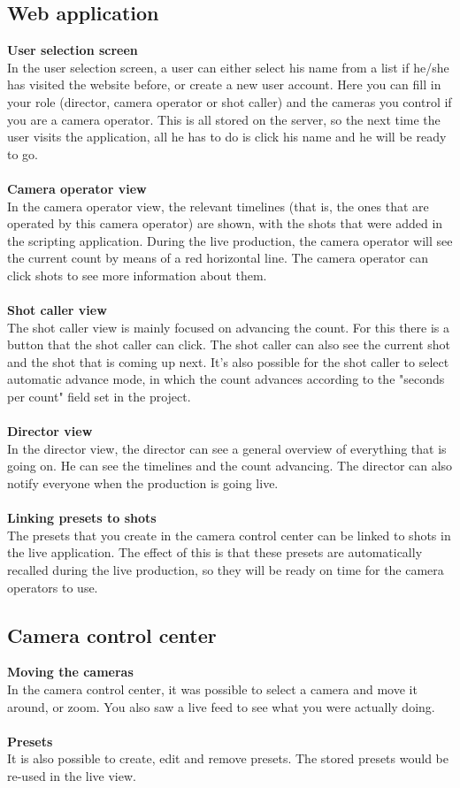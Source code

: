 \subsection{Web application}
\textbf{User selection screen}\\
In the user selection screen, a user can either select his name from a list if he/she has visited the website before, or create a new user account. Here you can fill in your role (director, camera operator or shot caller) and the cameras you control if you are a camera operator. This is all stored on the server, so the next time the user visits the application, all he has to do is click his name and he will be ready to go.\\\\
\textbf{Camera operator view}\\
In the camera operator view, the relevant timelines (that is, the ones that are operated by this camera operator) are shown, with the shots that were added in the scripting application. During the live production, the camera operator will see the current count by means of a red horizontal line. The camera operator can click shots to see more information about them.\\\\
\textbf{Shot caller view}\\
The shot caller view is mainly focused on advancing the count. For this there is a button that the shot caller can click. The shot caller can also see the current shot and the shot that is coming up next. It's also possible for the shot caller to select automatic advance mode, in which the count advances according to the "seconds per count" field set in the project.\\\\
\textbf{Director view}\\
In the director view, the director can see a general overview of everything that is going on. He can see the timelines and the count advancing. The director can also notify everyone when the production is going live.\\\\
\textbf{Linking presets to shots}\\
The presets that you create in the camera control center can be linked to shots in the live application. The effect of this is that these presets are automatically recalled during the live production, so they will be ready on time for the camera operators to use.

\subsection{Camera control center}
\textbf{Moving the cameras}\\
In the camera control center, it was possible to select a camera and move it around, or zoom. You also saw a live feed to see what you were actually doing.\\\\
\textbf{Presets}\\
It is also possible to create, edit and remove presets. The stored presets would be re-used in the live view.\\\\


